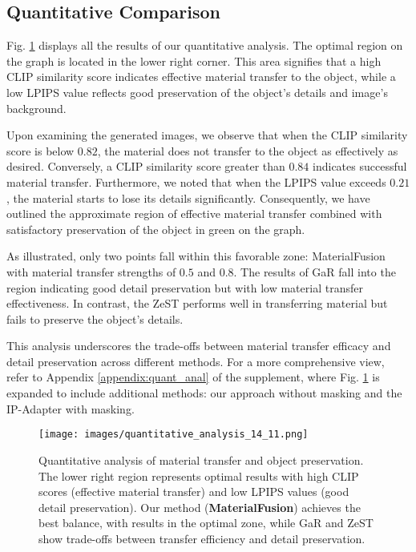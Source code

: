 \subsection{Quantitative Comparison}

Fig. \ref{fig:quant_anal} displays all the results of our quantitative analysis. The optimal region on the graph is located in the lower right corner. This area signifies that a high CLIP similarity score indicates effective material transfer to the object, while a low LPIPS value reflects good preservation of the object's details and image's background. 

Upon examining the generated images, we observe that when the CLIP similarity score is below $0.82$, the material does not transfer to the object as effectively as desired. Conversely, a CLIP similarity score greater than $0.84$ indicates successful material transfer. Furthermore, we noted that when the LPIPS value exceeds $0.21$, the material starts to lose its details significantly. Consequently, we have outlined the approximate region of effective material transfer combined with satisfactory preservation of the object in green on the graph.

As illustrated, only two points fall within this favorable zone: MaterialFusion with material transfer strengths of $0.5$ and $0.8$. The results of GaR fall into the region indicating good detail preservation but with low material transfer effectiveness. In contrast, the ZeST performs well in transferring material but fails to preserve the object's details.

This analysis underscores the trade-offs between material transfer efficacy and detail preservation across different methods. For a more comprehensive view, refer to Appendix \ref{appendix:quant_anal} of the supplement, where Fig. \ref{fig:quant_anal} is expanded to include additional methods: our approach without masking and the IP-Adapter with masking.


\begin{figure}[t]
  \centering
   
   \vspace{-15pt}
   \texttt{[image: images/quantitative\_analysis\_14\_11.png]}

   \caption{Quantitative analysis of material transfer and object preservation. The lower right region represents optimal results with high CLIP scores (effective material transfer) and low LPIPS values (good detail preservation). Our method (\textbf{MaterialFusion}) achieves the best balance, with results in the optimal zone, while GaR and ZeST show trade-offs between transfer efficiency and detail preservation.}
   \label{fig:quant_anal}

   \vspace{-5pt}
\end{figure}

